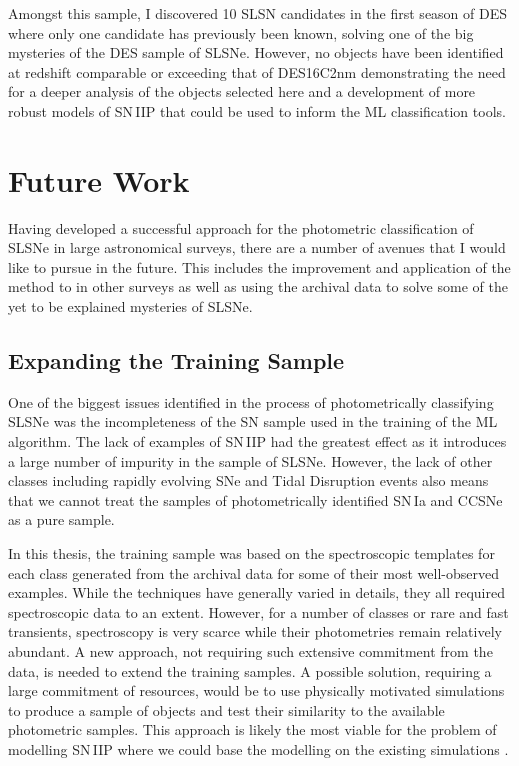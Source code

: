 Amongst this sample, I discovered 10 SLSN candidates in the first season of DES where only one candidate has previously been known, solving one of the big mysteries of the DES sample of SLSNe. However, no objects have been identified at redshift comparable or exceeding that of DES16C2nm demonstrating the need for a deeper analysis of the objects selected here and a development of more robust models of SN\,IIP that could be used to inform the ML classification tools.

\section{Future Work}
Having developed a successful approach for the photometric classification of SLSNe in large astronomical surveys, there are a number of avenues that I would like to pursue in the future. This includes the improvement and application of the method to in other surveys as well as using the archival data to solve some of the yet to be explained mysteries of SLSNe.

\subsection{Expanding the Training Sample}
One of the biggest issues identified in the process of photometrically classifying SLSNe was the incompleteness of the SN sample used in the training of the ML algorithm. The lack of examples of SN\,IIP had the greatest effect as it introduces a large number of impurity in the sample of SLSNe. However, the lack of other classes including rapidly evolving SNe and Tidal Disruption events also means that we cannot treat the samples of photometrically identified SN\,Ia and CCSNe as a pure sample.

In this thesis, the training sample was based on the spectroscopic templates for each class generated from the archival data for some of their most well-observed examples. While the techniques have generally varied in details, they all required spectroscopic data to an extent. However, for a number of classes or rare and fast transients, spectroscopy is very scarce while their photometries remain relatively abundant. A new approach, not requiring such extensive commitment from the data, is needed to extend the training samples. A possible solution, requiring a large commitment of resources, would be to use physically motivated simulations to produce a sample of objects and test their similarity to the available photometric samples. This approach is likely the most viable for the problem of modelling SN\,IIP where we could base the modelling on the existing simulations \citep{Dessart2013,Dessart2016}.

